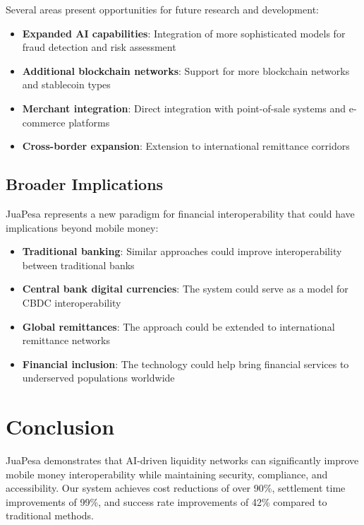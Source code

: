 \documentclass[11pt,a4paper]{article}
\begin{document}
Several areas present opportunities for future research and development:

\begin{itemize}
    \item \textbf{Expanded AI capabilities}: Integration of more sophisticated models for fraud detection and risk assessment
    \item \textbf{Additional blockchain networks}: Support for more blockchain networks and stablecoin types
    \item \textbf{Merchant integration}: Direct integration with point-of-sale systems and e-commerce platforms
    \item \textbf{Cross-border expansion}: Extension to international remittance corridors
\end{itemize}

\subsection{Broader Implications}

JuaPesa represents a new paradigm for financial interoperability that could have implications beyond mobile money:

\begin{itemize}
    \item \textbf{Traditional banking}: Similar approaches could improve interoperability between traditional banks
    \item \textbf{Central bank digital currencies}: The system could serve as a model for CBDC interoperability
    \item \textbf{Global remittances}: The approach could be extended to international remittance networks
    \item \textbf{Financial inclusion}: The technology could help bring financial services to underserved populations worldwide
\end{itemize}

\section{Conclusion}

JuaPesa demonstrates that AI-driven liquidity networks can significantly improve mobile money interoperability while maintaining security, compliance, and accessibility. Our system achieves cost reductions of over 90\%, settlement time improvements of 99\%, and success rate improvements of 42\% compared to traditional methods.
\end{document}
